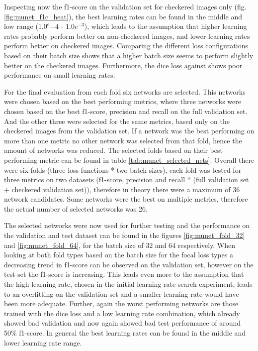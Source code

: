 Inspecting now the f1-score on the validation set for checkered images only (fig. \ref{fig:munet_f1c_heat}), the best learning rates can be found in the middle and low range ($1.0^e{-4}$ - $1.0e^{-3}$), which leads to the assumption that higher learning rates probably perform better on non-checkered images, and lower learning rates perform better on checkered images.
Comparing the different loss configurations based on their batch size shows that a higher batch size seems to perform slightly better on the checkered images.
Furthermore, the dice loss against shows poor performance on small learning rates.

For the final evaluation from each fold six networks are selected.
This networks were chosen based on the best performing metrics, where three networks were chosen based on the best f1-score, precision and recall on the full validation set.
And the other three were selected for the same metrics, based only on the checkered images from the validation set.
If a network was the best performing on more than one metric no other network was selected from that fold, hence the amount of networks was reduced.
The selected folds based on their best performing metric can be found in table \ref{tab:munet_selected_nets}.
Overall there were six folds (three loss functions * two batch sizes), each fold was tested for three metrics on two datasets (f1-score, precision and recall * (full validation set + checkered validation set)), therefore in theory there were a maximum of 36 network candidates.
Some networks were the best on multiple metrics, therefore the actual number of selected networks was 26.

The selected networks were now used for further testing and the performance on the validation and test dataset can be found in the figures \ref{fig:munet_fold_32} and \ref{fig:munet_fold_64}, for the batch size of 32 and 64 respectively.
When looking at both fold types based on the batch size for the focal loss types a decreasing trend in f1-score can be observed on the validation set, however on the test set the f1-score is increasing.
This leads even more to the assumption that the high learning rate, chosen in the initial learning rate search experiment, leads to an overfitting on the validation set and a smaller learning rate would have been more adequate.
Further, again the worst performing networks are those trained with the dice loss and a low learning rate combination, which already showed bad validation and now again showed bad test performance of around 50\% f1-score.
In general the best learning rates can be found in the middle and lower learning rate range.
